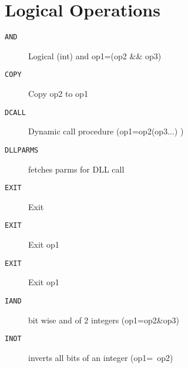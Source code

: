 \section{Logical Operations}
\begin{description}
\item[\texttt{AND        }]  Logical (int) and op1=(op2 \&\& op3)\\
\end{description}

\begin{description}
\item[\texttt{COPY       }]  Copy op2 to op1\\
\end{description}

\begin{description}
\item[\texttt{DCALL      }]  Dynamic call procedure (op1=op2(op3...) )\\
\end{description}

\begin{description}
\item[\texttt{DLLPARMS   }]  fetches parms for DLL call \\
\end{description}

\begin{description}
\item[\texttt{EXIT       }]  Exit\\
\end{description}

\begin{description}
\item[\texttt{EXIT       }]  Exit op1\\
\end{description}

\begin{description}
\item[\texttt{EXIT       }]  Exit op1\\
\end{description}

\begin{description}
\item[\texttt{IAND       }]  bit wise and of 2 integers (op1=op2\&op3)\\
\end{description}

\begin{description}
\item[\texttt{INOT       }]  inverts all bits of an integer (op1=~op2)\\
\end{description}
